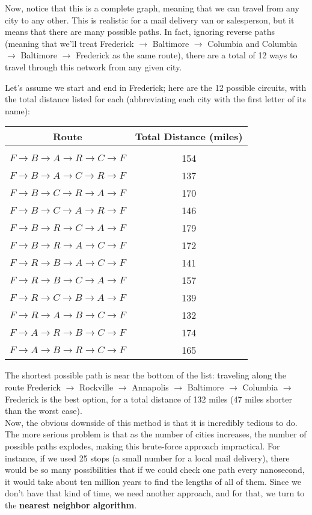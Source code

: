 Now, notice that this is a complete graph, meaning that we can travel from any city to any other.  This is realistic for a mail delivery van or salesperson, but it means that there are many possible paths.  In fact, ignoring reverse paths (meaning that we'll treat Frederick $\to$ Baltimore $\to$ Columbia and Columbia $\to$ Baltimore $\to$ Frederick as the same route), there are a total of 12 ways to travel through this network from any given city.

Let's assume we start and end in Frederick; here are the 12 possible circuits, with the total distance listed for each (abbreviating each city with the first letter of its name):
\begin{center}
\begin{tabular}{c c}
\textbf{Route} & \textbf{Total Distance (miles)}\\
\hline
& \\
$F \to B \to A \to R \to C \to F$ & 154\\
$F \to B \to A \to C \to R \to F$ & 137\\
$F \to B \to C \to R \to A \to F$ & 170\\
$F \to B \to C \to A \to R \to F$ & 146\\
$F \to B \to R \to C \to A \to F$ & 179\\
$F \to B \to R \to A \to C \to F$ & 172\\
$F \to R \to B \to A \to C \to F$ & 141\\
$F \to R \to B \to C \to A \to F$ & 157\\
$F \to R \to C \to B \to A \to F$ & 139\\
$F \to R \to A \to B \to C \to F$ & 132\\
$F \to A \to R \to B \to C \to F$ & 174\\
$F \to A \to B \to R \to C \to F$ & 165\\
\end{tabular}
\end{center}

The shortest possible path is near the bottom of the list: traveling along the route Frederick $\to$ Rockville $\to$ Annapolis $\to$ Baltimore $\to$ Columbia $\to$ Frederick is the best option, for a total distance of 132 miles (47 miles shorter than the worst case).\\

Now, the obvious downside of this method is that it is incredibly tedious to do.  The more serious problem is that as the number of cities increases, the number of possible paths explodes, making this brute-force approach impractical.  For instance, if we used 25 stops (a small number for a local mail delivery), there would be so many possibilities that if we could check one path every nanosecond, it would take about ten million years to find the lengths of all of them.  Since we don't have that kind of time, we need another approach, and for that, we turn to the \textbf{nearest neighbor algorithm}.

